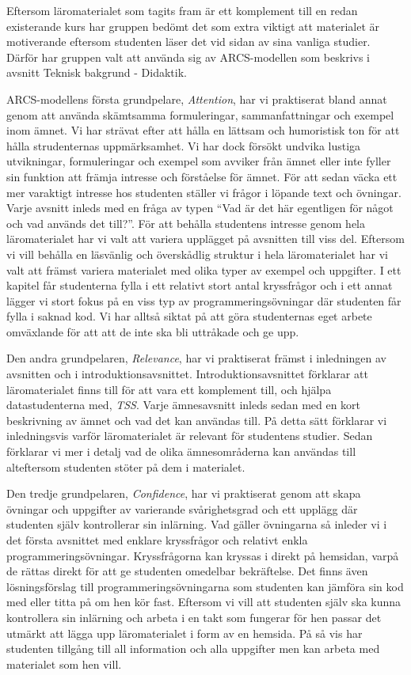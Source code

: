 \documentclass[]{article}
\begin{document}
Eftersom läromaterialet som tagits fram är ett komplement till en redan existerande kurs har gruppen 
bedömt det som extra viktigt att materialet är motiverande eftersom studenten läser det vid sidan av 
sina vanliga studier. Därför har gruppen valt att använda sig av ARCS-modellen som beskrivs i avsnitt 
Teknisk bakgrund - Didaktik. 

ARCS-modellens första grundpelare, \textit{Attention}, har vi praktiserat bland annat genom att använda 
skämtsamma formuleringar, sammanfattningar och exempel inom ämnet. Vi har strävat efter att hålla en 
lättsam och humoristisk ton för att hålla strudenternas uppmärksamhet. Vi har dock försökt undvika 
lustiga utvikningar, formuleringar och exempel som avviker från ämnet eller inte fyller sin funktion 
att främja intresse och förståelse för ämnet. För att sedan väcka ett mer varaktigt intresse hos 
studenten ställer vi frågor i löpande text och övningar. Varje avsnitt inleds med en fråga av typen 
“Vad är det här egentligen för något och vad används det till?”. För att behålla studentens intresse 
genom hela läromaterialet har vi valt att variera upplägget på avsnitten till viss del. Eftersom vi 
vill behålla en läsvänlig och överskådlig struktur i hela läromaterialet har vi valt att främst variera 
materialet med olika typer av exempel och uppgifter. I ett kapitel får studenterna fylla i ett relativt 
stort antal kryssfrågor och i ett annat lägger vi stort fokus på en viss typ av programmeringsövningar 
där studenten får fylla i saknad kod. Vi har alltså siktat på att göra studenternas eget arbete 
omväxlande för att att de inte ska bli uttråkade och ge upp.

Den andra grundpelaren, \textit{Relevance}, har vi praktiserat främst i inledningen av avsnitten och i 
introduktionsavsnittet. Introduktionsavsnittet förklarar att läromaterialet finns till för att vara ett 
komplement till, och hjälpa datastudenterna med, \textit{TSS}. Varje ämnesavsnitt inleds sedan med en kort 
beskrivning av ämnet och vad det kan användas till. På detta sätt förklarar vi inledningsvis varför 
läromaterialet är relevant för studentens studier. Sedan förklarar vi mer i detalj vad de olika 
ämnesområderna kan användas till alteftersom studenten stöter på dem i materialet.

Den tredje grundpelaren, \textit{Confidence}, har vi praktiserat genom att skapa övningar och uppgifter 
av varierande svårighetsgrad och ett upplägg där studenten själv kontrollerar sin inlärning. Vad gäller 
övningarna så inleder vi i det första avsnittet med enklare kryssfrågor och relativt enkla 
programmeringsövningar. Kryssfrågorna kan kryssas i direkt på hemsidan, varpå de rättas direkt för att 
ge studenten omedelbar bekräftelse. Det finns även lösningsförslag till programmeringsövningarna som 
studenten kan jämföra sin kod med eller titta på om hen kör fast. Eftersom vi vill att studenten själv 
ska kunna kontrollera sin inlärning och arbeta i en takt som fungerar för hen passar det utmärkt att 
lägga upp läromaterialet i form av en hemsida. På så vis har studenten tillgång till all information och 
alla uppgifter men kan arbeta med materialet som hen vill.
\end{document}
